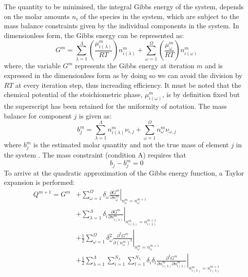 	The quantity to be minimised,  the integral Gibbs energy of the system, depends on the molar amounts $n_i$ of the species in the system, which are subject to the mass balance constraints given by the individual components in the system. In dimensionless form, the Gibbs energy can be represented as:
	\begin{equation}
		G^m = \sum_{\lambda=1}^{\Lambda} \left(\frac{\mu_{i(\lambda)}^m}{RT}\right)n_{i(\lambda)}^m + \sum_{\omega=1}^{\Omega}\left(\frac{\mu_{\omega}^m}{RT}\right)n_{i(\omega)}^m
	\end{equation}
	where, the variable $G^m$ represents the Gibbs energy at iteration $m$ and is expressed in the dimensionless form as by doing so we can avoid the division by $RT$ at every iteration step, thus increading efficiency. It must be noted that the chemical potential of the stoichiometric phase, ${\mu_{i(\omega)}^m}$, is by definition fixed but the superscript has been retained for the uniformity of notation.  The mass balance for component $j$ is given as:
	\begin{equation}
		b_j^m = \sum_{\lambda=1}^{\Lambda} n_{i(\lambda)}^m \nu_{i,j} + \sum_{\omega=1}^{\Omega}n_{\omega}^m \nu_{\omega ,j}
	\end{equation}
	where $b_j^m$ is the estimated molar quantity and not the true mass of element $j$ in the system \cite{Piro11b}. The mass constraint (condition A) requires that 
	\begin{equation}
		b_j - b_j^m = 0
	\end{equation}
	To arrive at the quadratic approximation of the Gibbs energy function, a Taylor expansion is performed:
	\begin{equation}
		\begin{aligned}
		Q^{m+1} = G^m &+ \left. \sum_{\omega=1}^{\Omega} \delta_{\omega} \frac{\partial G^m}{\partial n_{\omega}^m}\right\vert_{n_{\omega}^m = n_{\omega}^{m+1}} \\
				&+ \left. \sum_{\lambda=1}^{\Lambda} \delta_{i} \frac{\partial G^m}{\partial n_{i(\lambda)}^m}\right\vert_{n_{i(\lambda)}^m = n_{i(\lambda)}^{m+1}} \\
				&+ \frac{1}{2} \left. \sum_{\omega=1}^{\Omega} \delta_{\omega}^2 \frac{\partial^2 G^m}{\partial \left(n_{\omega}^m\right)^2}\right\vert_{n_{\omega}^m = n_{\omega}^{m+1}} \\
				&+ \frac{1}{2} \left. \sum_{\lambda=1}^{\Lambda} \sum_{i=1}^{N_{\lambda}} \sum_{l=1}^{N_{\lambda}} \delta_{i} \delta_{l} \frac{\partial^2 G^m}{\partial n_{i(\lambda)}^{m} \partial n_{l(\lambda)}^{m}} \right\vert_{n_{i(\lambda)}^m = n_{i(\lambda)}^{m+1}}
		\end{aligned}
	\end{equation} 
